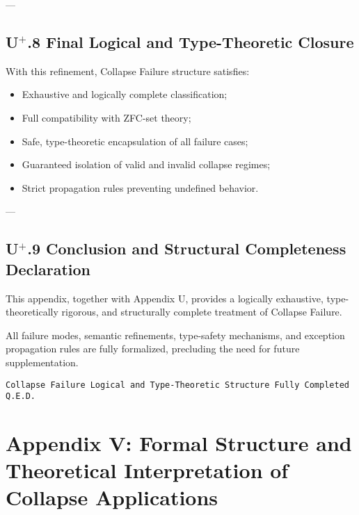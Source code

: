 \documentclass[11pt]{article}
\begin{document}
---

\subsection*{U$^{+}$.8 Final Logical and Type-Theoretic Closure}

With this refinement, Collapse Failure structure satisfies:

\begin{itemize}
    \item Exhaustive and logically complete classification;
    \item Full compatibility with ZFC-set theory;
    \item Safe, type-theoretic encapsulation of all failure cases;
    \item Guaranteed isolation of valid and invalid collapse regimes;
    \item Strict propagation rules preventing undefined behavior.
\end{itemize}

---

\subsection*{U$^{+}$.9 Conclusion and Structural Completeness Declaration}

This appendix, together with Appendix U, provides a logically exhaustive, type-theoretically rigorous, and structurally complete treatment of Collapse Failure.

All failure modes, semantic refinements, type-safety mechanisms, and exception propagation rules are fully formalized, precluding the need for future supplementation.

\begin{flushright}
\texttt{Collapse Failure Logical and Type-Theoretic Structure \quad Fully Completed \quad Q.E.D.}
\end{flushright}




\section*{Appendix V: Formal Structure and Theoretical Interpretation of Collapse Applications}
\end{document}
